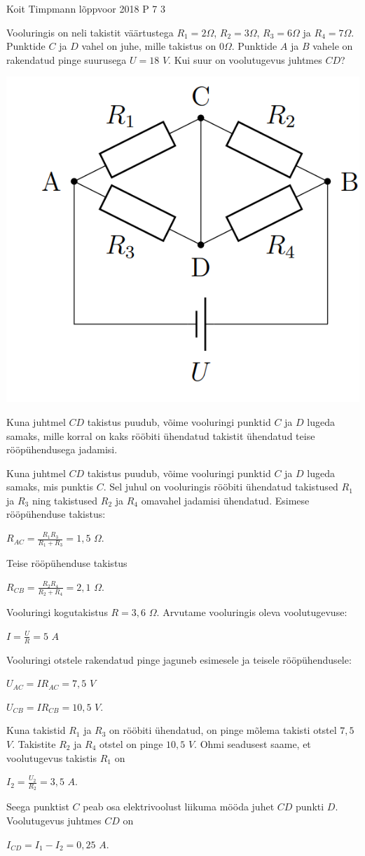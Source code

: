 {Koit Timpmann} %
{lõppvoor} %
{2018} %
{P 7} %
{3} %
{

\ifStatement
Vooluringis on neli takistit väärtustega $R_1 = 2 \Omega$, $R_2 = 3 \Omega$, $R_3 = 6 \Omega$ ja $R_4 = 7 \Omega$. Punktide $C$ ja $D$ vahel on juhe, mille takistus on $0 \Omega$. Punktide $A$ ja $B$ vahele on rakendatud pinge suurusega $U = 18$ $V$. Kui suur on voolutugevus juhtmes $CD$?
\begin{center}
	\includegraphics[width=0.5\linewidth]{2018-v3p-07-yl.png}
\end{center}
\fi

\ifHint
Kuna juhtmel $CD$ takistus puudub, võime vooluringi punktid $C$ ja $D$ lugeda samaks, mille korral on kaks rööbiti ühendatud takistit ühendatud teise rööpühendusega jadamisi.
\fi

\ifSolution
Kuna juhtmel $CD$ takistus puudub, võime vooluringi punktid $C$ ja $D$ lugeda samaks, mis punktis $C$. Sel juhul on vooluringis rööbiti ühendatud takistused $R_1$ ja $R_3$ ning takistused $R_2$ ja $R_4$ omavahel jadamisi ühendatud. 
Esimese rööpühenduse takistus:
\begin{center}
$R_{AC} = \frac{R_1 R_3}{R_1 + R_3} = 1,5$ $\Omega$.
\end{center}
Teise rööpühenduse takistus
\begin{center}
$R_{CB} = \frac{R_2 R_4}{R_2 + R_4} = 2,1$ $\Omega$.
\end{center}
Vooluringi kogutakistus $R = 3,6$ $\Omega$.
Arvutame vooluringis oleva voolutugevuse:
\begin{center}
$I = \frac{U}{R} = 5$ $A$
\end{center}
Vooluringi otstele rakendatud pinge jaguneb esimesele ja teisele rööpühendusele:
\begin{center}
$U_{AC} = I R_{AC} = 7,5$ $V$
\end{center}
\begin{center}
$U_{CB} = I R_{CB} = 10,5$ $V$.
\end{center}

Kuna takistid $R_1$ ja $R_3$ on rööbiti ühendatud, on pinge mõlema takisti otstel $7,5$ $V$. Takistite $R_2$ ja $R_4$ otstel on pinge $10,5$ $V$.
Ohmi seadusest saame, et voolutugevus takistis $R_1$ on
\begin{center}
$I_2 = \frac{U_2}{R_2} = 3,5$ $A$.
\end{center}
Seega punktist $C$ peab osa elektrivoolust liikuma mööda juhet $CD$ punkti $D$. Voolutugevus juhtmes $CD$ on
\begin{center}
$I_{CD} = I_1 - I_2 = 0,25$ $A$.
\end{center}
\fi
}